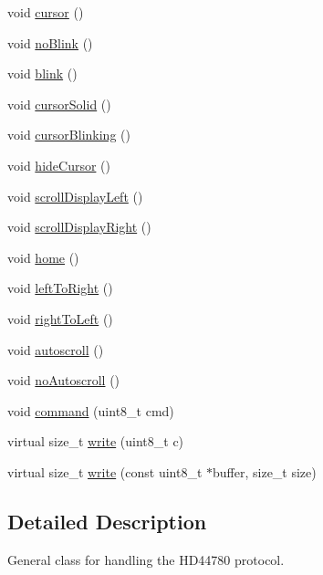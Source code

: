 \begin{DoxyCompactItemize}
\item 
void \hyperlink{class_pololu_h_d44780_base_a4fd53028d74561be579103d674aa8eab}{cursor} ()
\item 
void \hyperlink{class_pololu_h_d44780_base_a301afc921881052b166e11cd45ad9696}{no\+Blink} ()
\item 
void \hyperlink{class_pololu_h_d44780_base_ac6e255adf32d5c70c0163422b1ae8e0c}{blink} ()
\item 
void \hyperlink{class_pololu_h_d44780_base_a6a4d8e79beda9f7c81659a8e13c8c338}{cursor\+Solid} ()
\item 
void \hyperlink{class_pololu_h_d44780_base_a6a53a6cffbb77953b5a2c4ae49e288de}{cursor\+Blinking} ()
\item 
void \hyperlink{class_pololu_h_d44780_base_a1db083d254d251c479a577f29bcdcec8}{hide\+Cursor} ()
\item 
void \hyperlink{class_pololu_h_d44780_base_aada34a47663585f60b70e1d6f936f6d3}{scroll\+Display\+Left} ()
\item 
void \hyperlink{class_pololu_h_d44780_base_a411512707f303af75de3c5aea313bf48}{scroll\+Display\+Right} ()
\item 
void \hyperlink{class_pololu_h_d44780_base_ab2d24add3c6da0328055bceb38a6d42c}{home} ()
\item 
void \hyperlink{class_pololu_h_d44780_base_ada551bdb01681eb57bec325778eb38a6}{left\+To\+Right} ()
\item 
void \hyperlink{class_pololu_h_d44780_base_aa3f8d4ba18feb9aa0f0a2fef3c6c2b37}{right\+To\+Left} ()
\item 
void \hyperlink{class_pololu_h_d44780_base_ad5104d9651fd95704d1ae192073b0d61}{autoscroll} ()
\item 
void \hyperlink{class_pololu_h_d44780_base_aee80e23d270913dd2c353e7bd5408249}{no\+Autoscroll} ()
\item 
void \hyperlink{class_pololu_h_d44780_base_a449ad8d9ff7afb90667da0003a39af3b}{command} (uint8\+\_\+t cmd)
\item 
virtual size\+\_\+t \hyperlink{class_pololu_h_d44780_base_a1aad3b3ce5820dc910174b3c91a5d65e}{write} (uint8\+\_\+t c)
\item 
virtual size\+\_\+t \hyperlink{class_pololu_h_d44780_base_a965028ffd2313e9eaa968348effcab81}{write} (const uint8\+\_\+t $\ast$buffer, size\+\_\+t size)
\end{DoxyCompactItemize}


\subsection{Detailed Description}
General class for handling the H\+D44780 protocol. 

